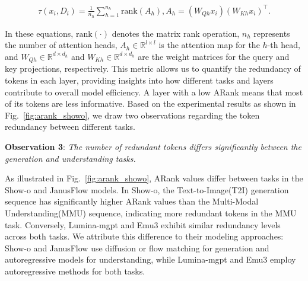 
\begin{equation}
\begin{aligned}
\tau(x_i, D_i) = \frac{1}{n_h} \sum_{h=1}^{n_h} \text{rank}(A_h),  
A_h = (W_{Qh} x_i)(W_{Kh} x_i)^\top.
\end{aligned}
\end{equation}


In these equations, \( \text{rank}(\cdot) \) denotes the matrix rank operation, \( n_h \) represents the number of attention heads, \( A_h \in \mathbb{R}^{l \times l} \) is the attention map for the \( h \)-th head, and \( W_{Qh} \in \mathbb{R}^{d \times d_h} \) and \( W_{Kh} \in \mathbb{R}^{d \times d_h} \) are the weight matrices for the query and key projections, respectively. This metric allows us to quantify the redundancy of tokens in each layer, providing insights into how different tasks and layers contribute to overall model efficiency. A layer with a low ARank means that most of its tokens are less informative. Based on the experimental results as shown in Fig.~\ref{fig:arank_showo}, we draw two observations regarding the token redundancy between different tasks.



\textbf{Observation 3}: \textit{The number of redundant tokens differs significantly between the generation and understanding tasks.}

As illustrated in Fig.~\ref{fig:arank_showo}, ARank values differ between tasks in the Show-o and JanusFlow models. In Show-o, the Text-to-Image(T2I) generation sequence has significantly higher ARank values than the Multi-Modal Understanding(MMU) sequence, indicating more redundant tokens in the MMU task. Conversely, Lumina-mgpt and Emu3 exhibit similar redundancy levels across both tasks. We attribute this difference to their modeling approaches: Show-o and JanusFlow use diffusion or flow matching for generation and autoregressive models for understanding, while Lumina-mgpt and Emu3 employ autoregressive methods for both tasks.


